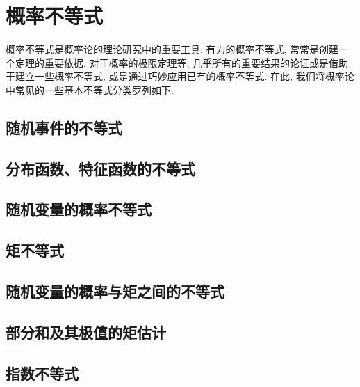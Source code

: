 \chapter{概率不等式}
概率不等式是概率论的理论研究中的重要工具. 有力的概率不等式, 常常是创建一个定理的重要依据. 对于概率的极限定理等, 几乎所有的重要结果的论证或是借助于建立一些概率不等式, 或是通过巧妙应用已有的概率不等式. 在此, 我们将概率论中常见的一些基本不等式分类罗列如下.

\section{随机事件的不等式}

\section{分布函数、特征函数的不等式}

\section{随机变量的概率不等式}

\section{矩不等式}

\section{随机变量的概率与矩之间的不等式}

\section{部分和及其极值的矩估计}

\section{指数不等式}

